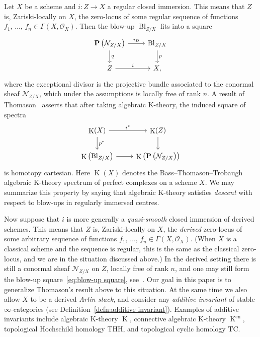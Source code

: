 \documentclass[11pt]{article}
\theoremstyle{definition}
\numberwithin{equation}{section}
\numberwithin{figure}{section}
\numberwithin{table}{section}
\newcommand{\sN}{\ensuremath{\mathcal{N}}\xspace}
\newcommand{\sO}{\ensuremath{\mathcal{O}}\xspace}
\newcommand{\bP}{\ensuremath{\mathbf{P}}\xspace}
\renewcommand{\P}{\bP}
\DeclareMathOperator{\K}{K}
\DeclareMathOperator{\Bl}{Bl}
\newcommand{\mrm}[1]{\ensuremath{\mathrm{#1}}\xspace}
\begin{document}
Let $X$ be a scheme and $i : Z \to X$ a regular closed immersion. This means that $Z$ is, Zariski-locally on $X$, the zero-locus of some regular sequence of functions $f_1,\,\ldots,\,f_n \in \Gamma(X,\sO_X)$. Then the blow-up $\Bl_{Z/X}$ fits into a square
\begin{equation}\label{eq:blow-up square}
\begin{tikzcd}
\P\left(\sN_{Z/X}\right) \ar{r}{i_D}\ar{d}{q} & \Bl_{Z/X} \ar{d}{p}
\\
Z \ar{r}{i} & X,
\end{tikzcd}
\end{equation}
where the exceptional divisor is the projective bundle associated to the conormal sheaf $\sN_{Z/X}$, which under the assumptions is locally free of rank $n$. A result of Thomason~\cite{ThomasonBlowup} asserts that after taking algebraic K-theory, the induced square of spectra
\[
\begin{tikzcd}
\K(X) \ar{r}{i^*}\ar{d}{p^*} & \K(Z) \ar{d}
\\
\K\left(\Bl_{Z/X}\right) \ar{r} & \K\left(\P\left(\sN_{Z/X}\right)\right)
\end{tikzcd}
\]
is homotopy cartesian. Here $\K(X)$ denotes the Bass--Thomason--Trobaugh algebraic K-theory spectrum of perfect complexes on a scheme $X$. We may summarize this property by saying that algebraic K-theory satisfies \emph{descent} with respect to blow-ups in regularly immersed centres.

Now suppose that $i$ is more generally a \emph{quasi-smooth} closed immersion of derived schemes. This means that $Z$ is, Zariski-locally on $X$, the \emph{derived} zero-locus of some arbitrary sequence of functions $f_1,\,\ldots,\,f_n \in \Gamma(X,\sO_X)$. (When $X$ is a classical scheme and the sequence is regular, this is the same as the classical zero-locus, and we are in the situation discussed above.) In the derived setting there is still a conormal sheaf $\sN_{Z/X}$ on $Z$, locally free of rank $n$, and one may still form the blow-up square~\eqref{eq:blow-up square}, see~\cite{KhanBlowup}. Our goal in this paper is to generalize Thomason's result above to this situation. At the same time we also allow $X$ to be a derived \emph{Artin stack}, and consider any \emph{additive invariant} of stable $\infty$-categories (see
Definition~\ref{defn:additive invariant}). Examples of additive invariants include algebraic K-theory $\K$, connective algebraic K-theory $\K^\mrm{cn}$, topological Hochschild homology $\mrm{THH}$, and topological cyclic homology $\mrm{TC}$.
\end{document}

